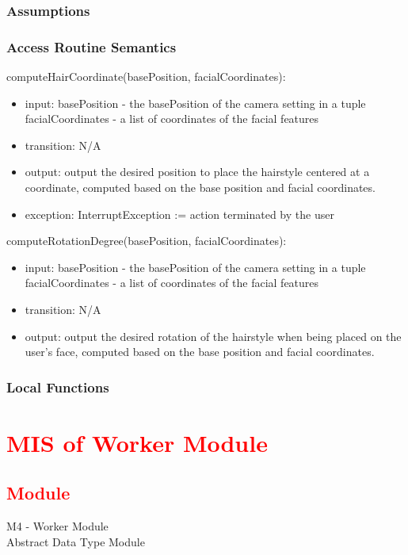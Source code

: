 \documentclass[12pt, titlepage]{article}
\begin{document}
\subsubsection{Assumptions}

\subsubsection{Access Routine Semantics}
\noindent computeHairCoordinate(basePosition, facialCoordinates):
\begin{itemize}
\item input: basePosition - the basePosition of the camera setting in a tuple \\
facialCoordinates - a list of coordinates of the facial features
\item transition: N/A
\item output: output the desired position to place the hairstyle centered at a coordinate, computed based on the base position and facial coordinates.
\item exception: InterruptException := action terminated by the user
\end{itemize}

\noindent computeRotationDegree(basePosition, facialCoordinates):
\begin{itemize}
\item input: basePosition - the basePosition of the camera setting in a tuple \\
facialCoordinates - a list of coordinates of the facial features
\item transition: N/A
\item output: output the desired rotation of the hairstyle when being placed on the user's face, computed based on the base position and facial coordinates.
\end{itemize}

\subsubsection{Local Functions}

\color{red}
\newpage
\section{\textcolor{red}{MIS of Worker Module}}
\subsection{\textcolor{red}{Module}}
M4 - Worker Module\\
Abstract Data Type Module
\end{document}
